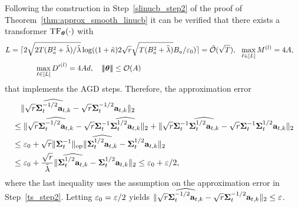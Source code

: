 Following the construction in Step~\ref{slinucb_step2} of the proof of Theorem~\ref{thm:approx_smooth_linucb} it can be verified that there exists a transformer ${\rm TF}_{\boldsymbol \theta}(\cdot)$ with 
 \begin{align*}
  &L=\lceil2\sqrt{2 T(B_a^2+\tilde\lambda)/\tilde\lambda}\log((1+{\tilde \kappa})2\sqrt{{r}}\sqrt{T(B_a^2+\tilde\lambda)}B_a/\varepsilon_0)\rceil={\tilde{\mathcal O}}(\sqrt{T}),~~\max_{\ell\in[L]}M^{(l)}=4A,~~~ \\
  &\qquad\qquad
  \max_{\ell\in[L]}{D'}^{(l)}=4Ad,~~~
  {\left|\!\left|\!\left|{{\boldsymbol \theta}}\right|\!\right|\!\right|}\leq  \mathcal{O}(A)
  \end{align*} that implements the AGD steps. Therefore, the approximation error 
  \begin{align*}
     &\quad\|\sqrt{{r}}\widehat{{{\mathbf\Sigma}}_t^{-1/2}{\mathbf a}_{t,k}} 
      -
      \sqrt{{r}}{{{\mathbf\Sigma}}_t^{-1/2}{\mathbf a}_{t,k}}
      \|_2\\
      &\leq
  \|\sqrt{{r}}\widehat{{{\mathbf\Sigma}}_t^{-1/2}{\mathbf a}_{t,k}} -\sqrt{{r}}{{\mathbf\Sigma}}_t^{-1}\widehat{{{\mathbf\Sigma}}_t^{1/2}{\mathbf a}_{t,k}} \|_2+ \|\sqrt{{r}}{{\mathbf\Sigma}}_t^{-1}\widehat{{{\mathbf\Sigma}}_t^{1/2}{\mathbf a}_{t,k}}-\sqrt{{r}}{{\mathbf\Sigma}}_t^{-1}{{{\mathbf\Sigma}}_t^{1/2}{\mathbf a}_{t,k}} \|_2\\
      &\leq \varepsilon_0+\sqrt{{r}}\|{{{\mathbf\Sigma}}_t^{-1}}\|_{\mathrm{op}}\|\widehat{{{\mathbf\Sigma}}_t^{1/2}{\mathbf a}_{t,k}}-{{\mathbf\Sigma}}_t^{1/2}{\mathbf a}_{t,k} \|_2\\
      &\leq 
\varepsilon_0+\frac{\sqrt{{r}}}{\tilde\lambda}\|\widehat{{{\mathbf\Sigma}}_t^{1/2}{\mathbf a}_{t,k}}-{{\mathbf\Sigma}}_t^{1/2}{\mathbf a}_{t,k} \|_2\leq \varepsilon_0+\varepsilon/2,
  \end{align*} where the last inequality uses the assumption on the approximation error in Step~\ref{ts_step2}. 
  Letting  $\varepsilon_0=\varepsilon/2$ yields $ \|\sqrt{{r}}\widehat{{{\mathbf\Sigma}}_t^{-1/2}{\mathbf a}_{t,k}} 
      -
      \sqrt{{r}}{{{\mathbf\Sigma}}_t^{-1/2}{\mathbf a}_{t,k}}
      \|_2\leq \varepsilon$. 


